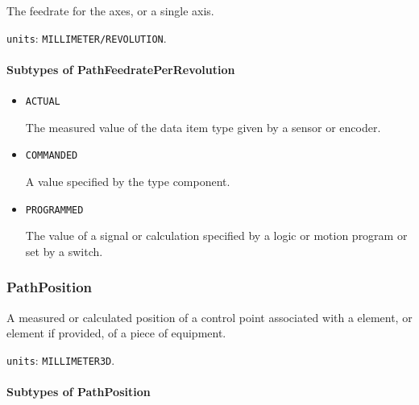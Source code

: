 The feedrate for the axes, or a single axis.


\texttt{units}: \texttt{MILLIMETER/REVOLUTION}.

\paragraph{Subtypes of PathFeedratePerRevolution}\mbox{}
\label{sec:Subtypes of PathFeedratePerRevolution}

\begin{itemize}

\item \texttt{ACTUAL}


The measured value of the data item type given by a sensor or encoder.

\item \texttt{COMMANDED}


A value specified by the  type component.

\item \texttt{PROGRAMMED}


The value of a signal or calculation specified by a logic or motion program or set by a switch.


\end{itemize}






\subsubsection{PathPosition}
\label{sec:PathPosition}



A measured or calculated position of a control point associated with a  element, or  element if provided, of a piece of equipment.


\texttt{units}: \texttt{MILLIMETER\textunderscore 3D}.

\paragraph{Subtypes of PathPosition}\mbox{}
\label{sec:Subtypes of PathPosition}

